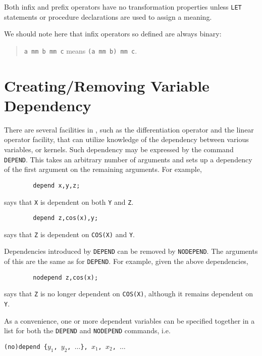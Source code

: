 Both infix and prefix operators have no transformation
properties unless \texttt{LET} statements or procedure
declarations are used to assign a meaning.

We should note here that infix operators so defined are always binary:
\begin{quote}
\hspace{0.2in}\texttt{a mm b mm c}\hspace{.3in} means \hspace{.3in}
\texttt{(a mm b) mm c}.
\end{quote}

\section{Creating/Removing Variable Dependency}
\hypertarget{command:DEPEND}{}
\hypertarget{command:NODEPEND}{}

There are several facilities in {\REDUCE}, such as the differentiation
operator and the linear operator facility, that
can utilize knowledge of the dependency between various variables, or
kernels.  Such dependency may be expressed by the command \texttt{DEPEND}.
This takes an arbitrary number of arguments and
sets up a dependency of the first argument on the remaining arguments.
For example,
\begin{verbatim}
        depend x,y,z;
\end{verbatim}
says that \texttt{X} is dependent on both \texttt{Y} and \texttt{Z}.
\begin{verbatim}
        depend z,cos(x),y;
\end{verbatim}
says that \texttt{Z} is dependent on \texttt{COS(X)} and \texttt{Y}.

Dependencies introduced by \texttt{DEPEND} can be removed by \texttt{NODEPEND}.
 The arguments of this are the same as for \texttt{DEPEND}.
For example, given the above dependencies,
\begin{verbatim}
        nodepend z,cos(x);
\end{verbatim}
says that \texttt{Z} is no longer dependent on \texttt{COS(X)}, although it remains
dependent on \texttt{Y}.

As a convenience, one or more dependent variables can be specified
together in a list for both the \texttt{DEPEND} and \texttt{NODEPEND}
commands, i.e.

\texttt{(no)depend \{$y_1$, $y_2$, $\ldots$\}, $x_1$, $x_2$, $\ldots$}

